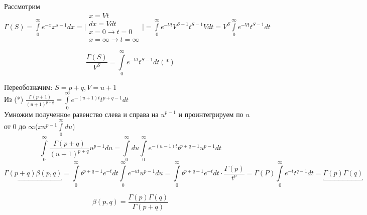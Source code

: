 \documentclass[12pt]{article}
\let\oldint\int
\renewcommand{\int}{\oldint\limits}
\begin{document}
    Рассмотрим $\Gamma(S)=\int_{0}^{\infty} e^{-x}x^{s-1}dx=\Bigg|
    \begin{matrix}
      x=Vt\\
      dx=Vdt\\
      x=0\rightarrow t=0\\
      x=\infty \rightarrow t=\infty
    \end{matrix}
    \Bigg|
    =\int_{0}^{\infty} e^{-Vt}V^{S-1}t^{S-1}Vdt=V^S\int_{0}^{\infty}e^{-Vt}t^{S-1}dt$

    \[\frac{\Gamma(S)}{V^S}=\int_{0}^{\infty}e^{-Vt}t^{S-1}dt (*)\]

    Переобозначим: $S=p+q, V=u+1$\\
    Из (*) $\frac{\Gamma(p+1)}{(u+1)^{p+q}}=\int_{0}^{\infty}e^{-(u+1)t}t^{p+q-1}dt$\\
    Умножим полученноe равенство слева и справа на $u^{p-1}$ и проинтегрируем по $u$ от 0 до
    $\infty$($xu^{p-1}\int_{0}^{\infty}du$)
    \[\int_{0}^{\infty} \frac{\Gamma(p+q)}{(u+1)^{p+q}}u^{p-1}du = \int_{0}^{\infty}
    du \int_{0}^{\infty}e^{-(u-1)t} t^{p+q-1}u^{p-1}dt\]
    \[ \underbracket{\Gamma(p+q)\beta(p,q)}=\int_{0}^{\infty}t^{p+q-1}e^{-t}dt \int_{0}^{\infty} e^{-ut}u^{p-1}du=
    \int_{0}^{\infty} t^{p+q-1}e^{-t}dt \cdot \frac{\Gamma(p)}{t^p}=\Gamma(P)\int_{0}^{\infty}
    e^{-t}t^{q-1}dt=\underbracket{\Gamma(p)\Gamma(q)}\]


    \[\boxed{\beta(p,q)=\frac{\Gamma(p)\Gamma(q)}{\Gamma(p+q)}}\]
    
\end{document}
